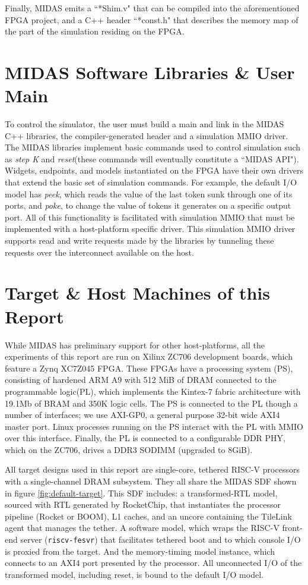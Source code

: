 Finally, MIDAS emits a ``*Shim.v" that can be compiled into the aforementioned
FPGA project, and a C++ header ``*const.h" that describes the memory map of the
part of the simulation residing on the FPGA.

\section{MIDAS Software Libraries \& User Main}

To control the simulator, the user must build a main and link in the MIDAS C++
libraries, the compiler-generated header and a simulation MMIO driver.  The
MIDAS libraries implement basic commands used to control simulation such as
\emph{step K} and \emph{reset}(these commands will eventually constitute a
``MIDAS API"). Widgets, endpoints, and models instantiated on the FPGA have
their own drivers that extend the basic set of simulation commands. For
example, the default I/O model has \emph{peek}, which reads the value of the
last token sunk through one of its ports, and \emph{poke}, to change the value
of tokens it generates on a specific output port.  All of this functionality is
facilitated with simulation MMIO that must be implemented with a host-platform
specific driver. This simulation MMIO driver supports read and write requests
made by the libraries by tunneling these requests over the interconnect available
on the host.

\section{Target \& Host Machines of this Report}\label{sec:targetandhostmachines}

While MIDAS has preliminary support for other host-platforms, all the
experiments of this report are run on Xilinx ZC706 development boards, which
feature a Zynq XC7Z045 FPGA. These FPGAs have a processing system (PS),
consisting of hardened ARM A9 with 512 MiB of DRAM connected to the
programmable logic(PL), which implements the Kintex-7 fabric architecture with
19.1Mb of BRAM and 350K logic cells. The PS is connected to the PL though a
number of interfaces; we use AXI-GP0, a general purpose 32-bit wide AXI4 master port.
Linux processes running on the PS interact with the PL with MMIO over this
interface. Finally, the PL is connected to a configurable DDR PHY, which on the
ZC706, drives a DDR3 SODIMM (upgraded to 8GiB).

All target designs used in this report are single-core, tethered RISC-V
processors with a single-channel DRAM subsystem.  They all share the MIDAS SDF
shown in figure \ref{fig:default-target}. This SDF includes: a transformed-RTL
model, sourced with RTL generated by RocketChip, that instantiates the
processor pipeline (Rocket or BOOM), L1 caches, and an uncore containing the
TileLink agent that manages the tether. A software model, which wraps the
RISC-V front-end server (\texttt{riscv-fesvr}) that facilitates tethered boot
and to which console I/O is proxied from the target. And the memory-timing
model instance, which connects to an AXI4 port presented by the processor.
All unconnected I/O of the transformed model, including reset, is bound to the
default I/O model.

